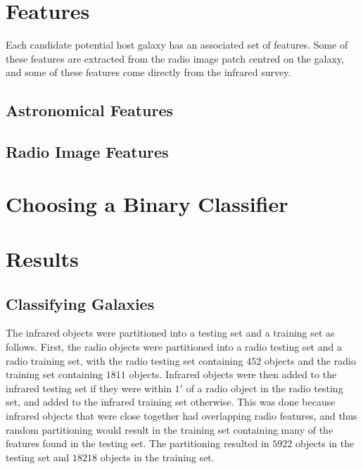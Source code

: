 \section{Features}
\label{sec:features}

  Each candidate potential host galaxy has an associated set of features. Some of these features are extracted from the radio image patch centred on the galaxy, and some of these features come directly from the infrared survey.

  \subsection{Astronomical Features}

  \subsection{Radio Image Features}

\section{Choosing a Binary Classifier}
\label{sec:binary-classifier}

\section{Results}
\label{sec:passive-results}
  
  \subsection{Classifying Galaxies}


    The infrared objects were partitioned into a testing set and a training set as follows. First, the radio objects were partitioned into a radio testing set and a radio training set, with the radio testing set containing $452$ objects and the radio training set containing $1811$ objects. Infrared objects were then added to the infrared testing set if they were within $1'$ of a radio object in the radio testing set, and added to the infrared training set otherwise. This was done because infrared objects that were close together had overlapping radio features, and thus random partitioning would result in the training set containing many of the features found in the testing set. The partitioning resulted in $5922$ objects in the testing set and $18218$ objects in the training set.

